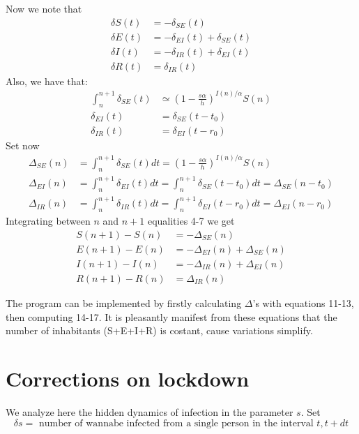 \documentclass{article}
\theoremstyle{definition}
\theoremstyle{plain}
\theoremstyle{plain}
\begin{document}
Now we note that
\begin{align}
    \delta S(t) & = - \delta_{SE}(t) \\
    \delta E(t) & = - \delta_{EI}(t) + \delta_{SE}(t) \\
    \delta I (t) & = - \delta_{IR}(t) + \delta_{EI}(t) \\
    \delta R(t) & = \delta_{IR}(t) 
\end{align}
Also, we have that:
\begin{align}
    \int_{n}^{n+1} \delta_{SE}(t) & \simeq \left ( 1- \frac{s\alpha}{h} \right )^{I(n) / \alpha} S(n)  \\
    \delta_{EI}(t) & = \delta_{SE}(t- t_0) \\
    \delta_{IR}(t) & = \delta_{EI}(t-r_0)
\end{align}
Set now
\begin{align}
\Delta_{SE}(n) & = \int_{n}^{n+1}  \delta_{SE}(t) dt = \left ( 1- \frac{s\alpha}{h} \right )^{I(n) / \alpha} S(n) \\
   \Delta_{EI}(n) & = \int_{n}^{n+1}  \delta_{EI}(t) dt  = \int_{n}^{n+1} \delta_{SE}(t-t_0) dt = \Delta_{SE}(n-t_0)\\
   \Delta_{IR}(n) & = \int_{n}^{n+1} \delta_{IR} (t) dt = \int_{n}^{n+1} \delta_{EI} (t-r_0) dt = \Delta_{EI}(n-r_0) 
\end{align}
Integrating between $n$ and $n+1$ equalities 4-7 we get
\begin{align}
    S(n+1) - S(n) & = - \Delta_{SE}(n) \\
    E(n+1) - E(n) & = - \Delta_{EI}(n) + \Delta_{SE}(n) \\
    I(n+1)-I(n) & = - \Delta_{IR}(n) + \Delta_{EI}(n) \\
    R(n+1)-R(n) & = \Delta_{IR}(n) 
\end{align}

The program can be implemented by firstly calculating $\Delta$'s with equations 11-13, then computing 14-17. It is pleasantly manifest from these equations that the number of inhabitants (S+E+I+R) is costant, cause variations simplify.

\section{Corrections on lockdown}

We analyze here the hidden dynamics of infection in the parameter $s$. Set
$$ \delta s = \text{ number of wannabe infected from a single person in the interval } t, t+dt $$
\end{document}

